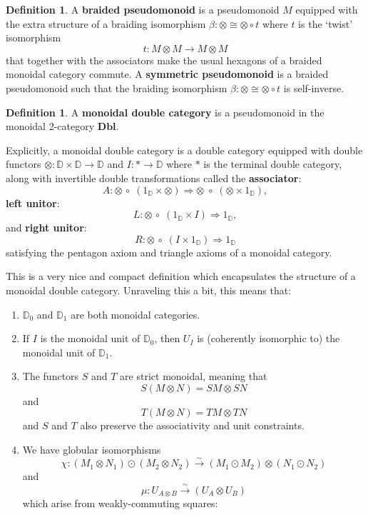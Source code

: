 \documentclass[oneside,final]{ucr}
\theoremstyle{definition}
\newtheorem{definition}[theorem]{Definition}
\newcommand{\ten}{\otimes}
\newcommand{\maps}{\colon}
\newcommand{\define}[1]{{\bf \boldmath #1}}
\begin{document}
{\begin{definition}
A \define{braided pseudomonoid} is a pseudomonoid $M$ equipped with the extra structure of a braiding isomorphism $\beta \colon \otimes \cong \otimes \circ t$ where $t$ is the `twist' isomorphism $$t \colon M \otimes M \to M \otimes M$$ that together with the associators make the usual hexagons of a braided monoidal category commute. A \define{symmetric pseudomonoid} is a braided pseudomonoid such that the braiding isomorphism $\beta \colon \otimes \cong \otimes \circ t$ is self-inverse.
\end{definition}


\begin{definition}\label{defn:monoidal_double_category}
A \define{monoidal double category} is a pseudomonoid in the monoidal 2-category $\mathbf{Dbl}$. 

Explicitly, a monoidal double category is a double category equipped with double functors $\otimes \maps \mathbb{D} \times \mathbb{D} \to \mathbb{D}$ and $I \maps * \to \mathbb{D}$ where $*$ is the terminal double category, along with invertible double transformations called the \define{associator}:
\[  A \maps \otimes \, \circ \; (1_{\mathbb{D}} \times \otimes ) \Rightarrow \otimes \; \circ \; (\otimes \times 1_{\mathbb{D}}) ,\]
\define{left unitor}:
\[ L\maps \otimes \, \circ \; (1_{\mathbb{D}} \times I) \Rightarrow 1_{\mathbb{D}} ,\]
and \define{right unitor}:
\[ R \maps \otimes \,\circ\; (I \times 1_{\mathbb{D}}) \Rightarrow 1_{\mathbb{D}} \]
satisfying the pentagon axiom and triangle axioms of a monoidal category.
\end{definition}

This is a very nice and compact definition which encapsulates the structure of a monoidal double category. Unraveling this a bit, this means that:
\begin{enumerate}
\item $\mathbb{D}_0$ and $\mathbb{D}_1$ are both monoidal categories.
\item If $I$ is the monoidal unit of $\mathbb{D}_0$, then $U_I$ is (coherently isomorphic to) the
  monoidal unit of $\mathbb{D}_1$.
\item The functors $S$ and $T$ are strict monoidal, meaning that  $$S(M\ten N)
  = SM\ten SN$$ and $$T(M\ten N)=TM\ten TN$$ and $S$ and $T$ also
  preserve the associativity and unit constraints.
\item We have globular isomorphisms 
  \[\chi \maps (M_1\ten N_1)\odot (M_2\ten N_2)\xrightarrow{\sim} (M_1\odot M_2)\ten (N_1\odot N_2)\]
  and
  \[\mu\maps U_{A\ten B} \xrightarrow{\sim} (U_A \ten U_B)\] which arise from weakly-commuting squares:


\end{enumerate}}
\end{document}
